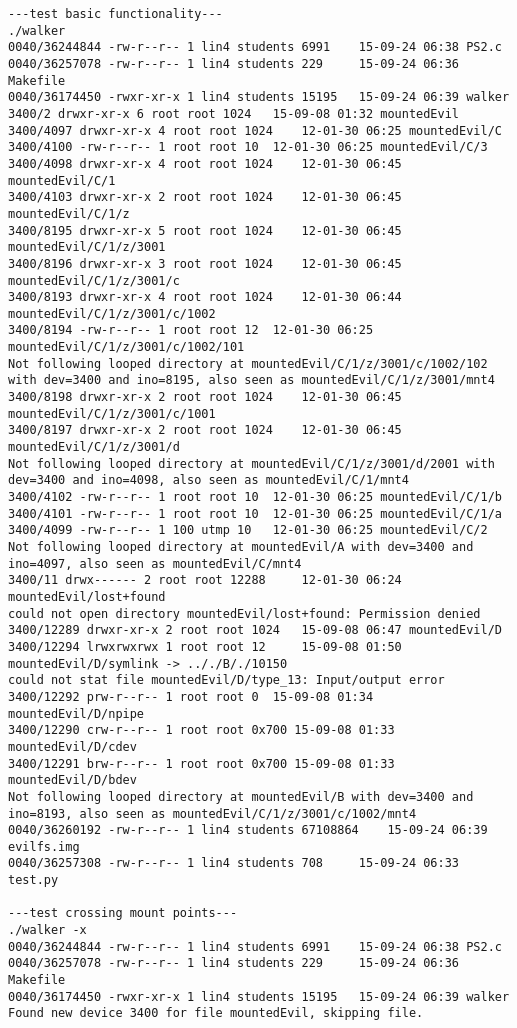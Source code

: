 \documentclass[12pt]{article}
\begin{document}
\begin{lstlisting}
---test basic functionality---
./walker
0040/36244844 -rw-r--r-- 1 lin4 students 6991	 15-09-24 06:38 PS2.c
0040/36257078 -rw-r--r-- 1 lin4 students 229	 15-09-24 06:36 Makefile
0040/36174450 -rwxr-xr-x 1 lin4 students 15195	 15-09-24 06:39 walker
3400/2 drwxr-xr-x 6 root root 1024	 15-09-08 01:32 mountedEvil
3400/4097 drwxr-xr-x 4 root root 1024	 12-01-30 06:25 mountedEvil/C
3400/4100 -rw-r--r-- 1 root root 10	 12-01-30 06:25 mountedEvil/C/3
3400/4098 drwxr-xr-x 4 root root 1024	 12-01-30 06:45 mountedEvil/C/1
3400/4103 drwxr-xr-x 2 root root 1024	 12-01-30 06:45 mountedEvil/C/1/z
3400/8195 drwxr-xr-x 5 root root 1024	 12-01-30 06:45 mountedEvil/C/1/z/3001
3400/8196 drwxr-xr-x 3 root root 1024	 12-01-30 06:45 mountedEvil/C/1/z/3001/c
3400/8193 drwxr-xr-x 4 root root 1024	 12-01-30 06:44 mountedEvil/C/1/z/3001/c/1002
3400/8194 -rw-r--r-- 1 root root 12	 12-01-30 06:25 mountedEvil/C/1/z/3001/c/1002/101
Not following looped directory at mountedEvil/C/1/z/3001/c/1002/102 with dev=3400 and ino=8195, also seen as mountedEvil/C/1/z/3001/mnt4
3400/8198 drwxr-xr-x 2 root root 1024	 12-01-30 06:45 mountedEvil/C/1/z/3001/c/1001
3400/8197 drwxr-xr-x 2 root root 1024	 12-01-30 06:45 mountedEvil/C/1/z/3001/d
Not following looped directory at mountedEvil/C/1/z/3001/d/2001 with dev=3400 and ino=4098, also seen as mountedEvil/C/1/mnt4
3400/4102 -rw-r--r-- 1 root root 10	 12-01-30 06:25 mountedEvil/C/1/b
3400/4101 -rw-r--r-- 1 root root 10	 12-01-30 06:25 mountedEvil/C/1/a
3400/4099 -rw-r--r-- 1 100 utmp 10	 12-01-30 06:25 mountedEvil/C/2
Not following looped directory at mountedEvil/A with dev=3400 and ino=4097, also seen as mountedEvil/C/mnt4
3400/11 drwx------ 2 root root 12288	 12-01-30 06:24 mountedEvil/lost+found
could not open directory mountedEvil/lost+found: Permission denied
3400/12289 drwxr-xr-x 2 root root 1024	 15-09-08 06:47 mountedEvil/D
3400/12294 lrwxrwxrwx 1 root root 12	 15-09-08 01:50 mountedEvil/D/symlink -> .././B/./10150
could not stat file mountedEvil/D/type_13: Input/output error
3400/12292 prw-r--r-- 1 root root 0	 15-09-08 01:34 mountedEvil/D/npipe
3400/12290 crw-r--r-- 1 root root 0x700 15-09-08 01:33 mountedEvil/D/cdev
3400/12291 brw-r--r-- 1 root root 0x700 15-09-08 01:33 mountedEvil/D/bdev
Not following looped directory at mountedEvil/B with dev=3400 and ino=8193, also seen as mountedEvil/C/1/z/3001/c/1002/mnt4
0040/36260192 -rw-r--r-- 1 lin4 students 67108864	 15-09-24 06:39 evilfs.img
0040/36257308 -rw-r--r-- 1 lin4 students 708	 15-09-24 06:33 test.py

---test crossing mount points---
./walker -x
0040/36244844 -rw-r--r-- 1 lin4 students 6991	 15-09-24 06:38 PS2.c
0040/36257078 -rw-r--r-- 1 lin4 students 229	 15-09-24 06:36 Makefile
0040/36174450 -rwxr-xr-x 1 lin4 students 15195	 15-09-24 06:39 walker
Found new device 3400 for file mountedEvil, skipping file.


\end{lstlisting}
\end{document}
